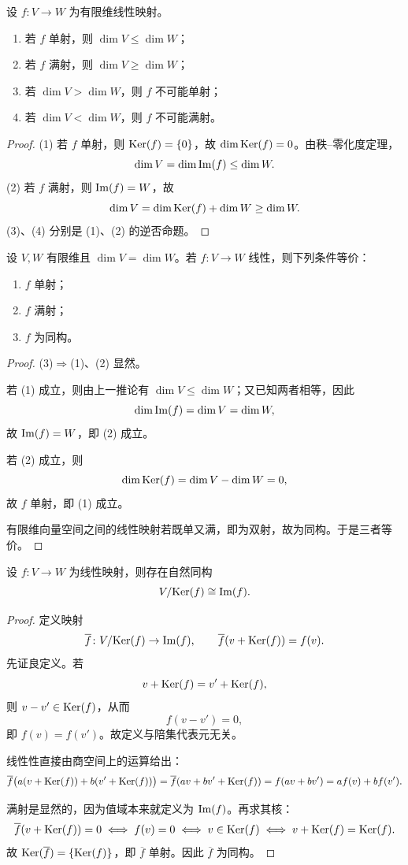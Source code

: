 \begin{corollary}
设 $f\colon V\to W$ 为有限维线性映射。
\begin{enumerate}[label=\textnormal{(\arabic*)}]
  \item 若 $f$ 单射，则 $\dim V\le \dim W$；
  \item 若 $f$ 满射，则 $\dim V\ge \dim W$；
  \item 若 $\dim V>\dim W$，则 $f$ 不可能单射；
  \item 若 $\dim V<\dim W$，则 $f$ 不可能满射。
\end{enumerate}
\end{corollary}

\begin{proof}
(1) 若 $f$ 单射，则 $\mathrm{Ker}(f)=\{0\}$，故 $\dim\mathrm{Ker}(f)=0$。由秩--零化度定理，
\[
  \dim V=\dim\mathrm{Im}(f)\le \dim W.
\]
(2) 若 $f$ 满射，则 $\mathrm{Im}(f)=W$，故
\[
  \dim V=\dim\mathrm{Ker}(f)+\dim W\ge \dim W.
\]
(3)、(4) 分别是 (1)、(2) 的逆否命题。
\end{proof}

\begin{corollary}
设 $V,W$ 有限维且 $\dim V=\dim W$。若 $f\colon V\to W$ 线性，则下列条件等价：
\begin{enumerate}[label=\textnormal{(\arabic*)}]
  \item $f$ 单射；
  \item $f$ 满射；
  \item $f$ 为同构。
\end{enumerate}
\end{corollary}

\begin{proof}
(3)$\Rightarrow$(1)、(2) 显然。

若 (1) 成立，则由上一推论有 $\dim V\le \dim W$；又已知两者相等，因此
\[
  \dim\mathrm{Im}(f)=\dim V=\dim W,
\]
故 $\mathrm{Im}(f)=W$，即 (2) 成立。

若 (2) 成立，则
\[
  \dim\mathrm{Ker}(f)=\dim V-\dim W=0,
\]
故 $f$ 单射，即 (1) 成立。

有限维向量空间之间的线性映射若既单又满，即为双射，故为同构。于是三者等价。
\end{proof}

\begin{proposition}[第一同构定理]
设 $f\colon V\to W$ 为线性映射，则存在自然同构
\[
  V/\mathrm{Ker}(f)\cong \mathrm{Im}(f).
\]
\end{proposition}

\begin{proof}
定义映射
\[
  \overline f\colon V/\mathrm{Ker}(f)\to \mathrm{Im}(f),
  \qquad
  \overline f(v+\mathrm{Ker}(f))=f(v).
\]
先证良定义。若
\[
  v+\mathrm{Ker}(f)=v'+\mathrm{Ker}(f),
\]
则 $v-v'\in\mathrm{Ker}(f)$，从而
\[
  f(v-v')=0,
\]
即 $f(v)=f(v')$。故定义与陪集代表元无关。

线性性直接由商空间上的运算给出：
\[
  \overline f\bigl(a(v+\mathrm{Ker}(f))+b(v'+\mathrm{Ker}(f))\bigr)
  =\overline f(av+bv'+\mathrm{Ker}(f))
  =f(av+bv')
  =a f(v)+b f(v').
\]

满射是显然的，因为值域本来就定义为 $\mathrm{Im}(f)$。再求其核：
\[
  \overline f(v+\mathrm{Ker}(f))=0
  \iff f(v)=0
  \iff v\in\mathrm{Ker}(f)
  \iff v+\mathrm{Ker}(f)=\mathrm{Ker}(f).
\]
故 $\mathrm{Ker}(\overline f)=\{\mathrm{Ker}(f)\}$，即 $\overline f$ 单射。因此 $\overline f$ 为同构。
\end{proof}

